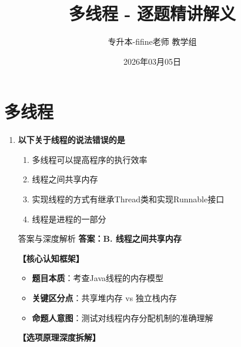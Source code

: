 \documentclass[12pt, a4paper]{ctexart}
\title{\textcolor{myblue}{\textbf{多线程 - 逐题精讲解义}}}
\author{专升本-fifine老师 教学组}
\date{2026年03月05日}
\begin{document}
\maketitle
\thispagestyle{empty}
\newpage

\section{多线程}

\begin{enumerate}[label=\textbf{\arabic*.}]

	\item \textbf{以下关于线程的说法错误的是}
	      \begin{enumerate}[label=\Alph*.]
		      \item 多线程可以提高程序的执行效率
		      \item 线程之间共享内存
		      \item 实现线程的方式有继承Thread类和实现Runnable接口
		      \item 线程是进程的一部分
	      \end{enumerate}

	      \begin{bluebox}{答案与深度解析}
		      \textbf{答案：B. 线程之间共享内存}

		      \textbf{【核心认知框架】}
		      \begin{itemize}[label={}, leftmargin=*, nosep]
			      \item \textbf{题目本质}：考查Java线程的内存模型
			      \item \textbf{关键区分点}：共享堆内存 vs 独立栈内存
			      \item \textbf{命题人意图}：测试对线程内存分配机制的准确理解
		      \end{itemize}

		      \textbf{【选项原理深度拆解】}


\end{bluebox}
\end{enumerate}
\end{document}
